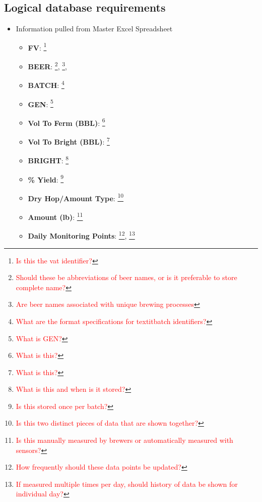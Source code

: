 \documentclass[draftclsnofoot,onecolumn,letterpaper,10pt,compsoc]{IEEEtran}
\newcommand\question[1]{\footnote{\textcolor{red}{#1}}}
\begin{document}
	\subsection{Logical database requirements}
    \begin{itemize}
        \item{Information pulled from Master Excel Spreadsheet}
            \begin{itemize}
                \item{\textbf{FV}:
                    \question{Is this the vat identifier?}
                }
                \item{\textbf{BEER}:
                    \question{Should these be abbreviations of beer names, or is it preferable to store complete name?},
                    \question{Are beer names associated with unique brewing processes},
                }
                \item{\textbf{BATCH}:
                    \question{What are the format specifications for textit{batch identifiers}?}
                }
                \item{\textbf{GEN}:
                    \question{What is GEN?}
                }
                \item{\textbf{Vol To Ferm (BBL)}:
                    \question{What is this?}
                }
                \item{\textbf{Vol To Bright (BBL)}: 
                    \question{What is this?}
                }
                \item{\textbf{BRIGHT}:
                    \question{What is this and when is it stored?}
                }
                \item{\textbf{\% Yield}:
                    \question{Is this stored once per batch?}
                }
                \item{\textbf{Dry Hop/Amount Type}:
                    \question{Is this two distinct pieces of data that are shown together?}
                }
                \item{\textbf{Amount (lb)}:
                    \question{Is this manually measured by brewers or automatically measured with sensors?}
                }
                \item{\textbf{Daily Monitoring Points}:
                    \question{How frequently should these data points be updated?},
                    \question{If measured multiple times per day, should history of data be shown for individual day?}
                }
                \begin{itemize}

\end{itemize}
\end{itemize}
\end{itemize}
\end{document}
